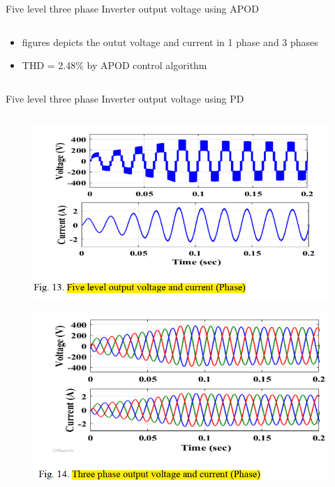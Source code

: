 \documentclass[
	11pt, %
]{beamer}
\begin{document}
\begin{frame}{Five level three phase Inverter output voltage using APOD}
\begin{column}{0.5\textwidth}
\begin{figure}
		\end{figure}
		\begin{itemize}
			\scriptsize
			\item {figures depicts the outut voltage and current in 1 phase and 3 phases}
			\item {THD = 2.48\% by APOD control algorithm}
		\end{itemize}
	\end{column}
\end{frame}

\begin{frame}{Five level three phase Inverter output voltage using PD}
	\begin{column}{0.5\textwidth}
		\begin{figure}
			\includegraphics[width=1\linewidth]{PD_V_C.png}
		\end{figure}
		\begin{figure}
			\includegraphics[width=1\linewidth]{PD_V_C_3.png}
		\end{figure}
	\end{column}
	\begin{column}{0.5\textwidth}

\end{column}
\end{frame}
\end{document}
